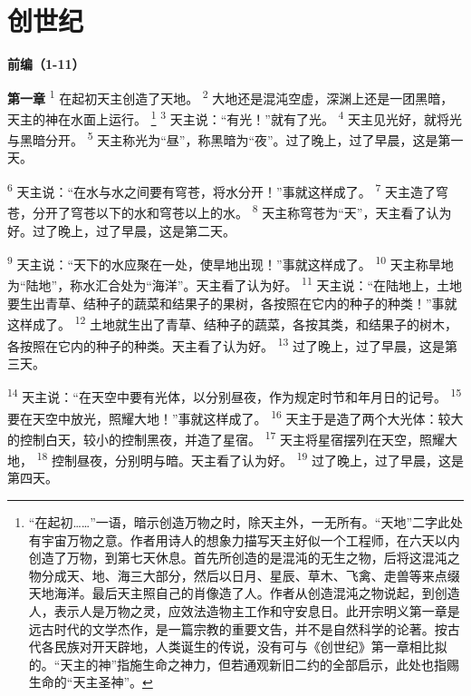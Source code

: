 \chapter*{创世纪}


\begin{center}
	\textbf{\large{\songti 前编（1-11）}}
\end{center}

\textbf{第一章\quad}
\textsuperscript{1}
在起初天主创造了天地。
\textsuperscript{2}  
大地还是混沌空虚，深渊上还是一团黑暗，天主的神在水面上运行。
\renewcommand\thefootnote{\ding{\numexpr171+\value{footnote}}}
\footnote{“在起初……”一语，暗示创造万物之时，除天主外，一无所有。“天地”二字此处有宇宙万物之意。作者用诗人的想象力描写天主好似一个工程师，在六天以内创造了万物，到第七天休息。首先所创造的是混沌的无生之物，后将这混沌之物分成天、地、海三大部分，然后以日月、星辰、草木、飞禽、走兽等来点缀天地海洋。最后天主照自己的肖像造了人。作者从创造混沌之物说起，到创造人，表示人是万物之灵，应效法造物主工作和守安息日。此开宗明义第一章是远古时代的文学杰作，是一篇宗教的重要文告，并不是自然科学的论著。按古代各民族对开天辟地，人类诞生的传说，没有可与《创世纪》第一章相比拟的。“天主的神”指施生命之神力，但若通观新旧二约的全部启示，此处也指赐生命的“天主圣神”。}
\textsuperscript{3}
天主说：“有光！”就有了光。
\textsuperscript{4}
天主见光好，就将光与黑暗分开。
\textsuperscript{5}
天主称光为“昼”，称黑暗为“夜”。过了晚上，过了早晨，这是第一天。

\textsuperscript{6}
天主说：“在水与水之间要有穹苍，将水分开！”事就这样成了。
\textsuperscript{7}
天主造了穹苍，分开了穹苍以下的水和穹苍以上的水。
\textsuperscript{8}
天主称穹苍为“天”，天主看了认为好。过了晚上，过了早晨，这是第二天。

\textsuperscript{9}
天主说：“天下的水应聚在一处，使旱地出现！”事就这样成了。
\textsuperscript{10}
天主称旱地为“陆地”，称水汇合处为“海洋”。天主看了认为好。
\textsuperscript{11}
天主说：“在陆地上，土地要生出青草、结种子的蔬菜和结果子的果树，各按照在它内的种子的种类！”事就这样成了。
\textsuperscript{12}
土地就生出了青草、结种子的蔬菜，各按其类，和结果子的树木，各按照在它内的种子的种类。天主看了认为好。
\textsuperscript{13}
过了晚上，过了早晨，这是第三天。

\textsuperscript{14}
天主说：“在天空中要有光体，以分别昼夜，作为规定时节和年月日的记号。
\textsuperscript{15}
要在天空中放光，照耀大地！”事就这样成了。
\textsuperscript{16}
天主于是造了两个大光体：较大的控制白天，较小的控制黑夜，并造了星宿。
\textsuperscript{17}
天主将星宿摆列在天空，照耀大地，
\textsuperscript{18}
控制昼夜，分别明与暗。天主看了认为好。
\textsuperscript{19}
过了晚上，过了早晨，这是第四天。

